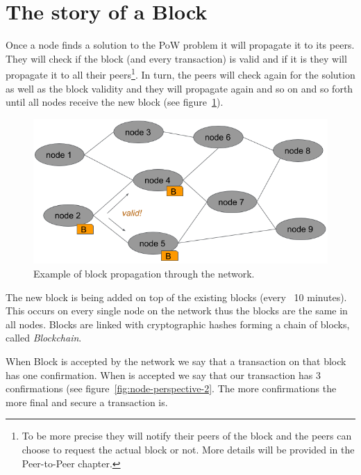 \section{The story of a Block}
\label{sec:blocks-nakamote-consensus}
Once a node finds a solution to the PoW problem it will propagate it to its peers. They will check if the block (and every transaction) is valid and if it is they will propagate it to all their peers\footnote{To be more precise they will notify their peers of the block and the peers can choose to request the actual block or not. More details will be provided in the Peer-to-Peer chapter.}. In turn, the peers will check again for the solution as well as the block validity and they will propagate again and so on and so forth until all nodes receive the new block (see figure~\ref{fig:block-propagation}).

\begin{figure}[h]
\begin{center}
\includegraphics[scale=0.5]{images/block-propagation}
\caption{Example of block propagation through the network.}
\label{fig:block-propagation}
\end{center}
\end{figure}

The new block is being added on top of the existing blocks (every ~10 minutes). This occurs on every single node on the network thus the blocks are the same in all nodes. Blocks are linked with cryptographic hashes forming a chain of blocks, called \emph{Blockchain}.

When Block  is accepted by the network we say that a transaction on that block has one confirmation. When  is accepted we say that our transaction has 3 confirmations (see figure~\ref{fig:node-perspective-2}. The more confirmations the more final and secure a transaction is. 


